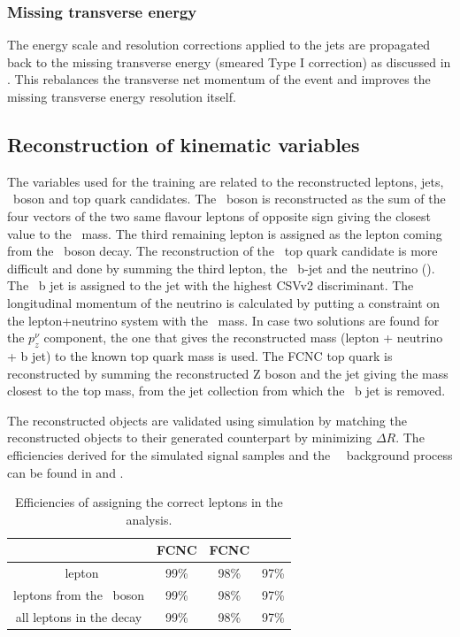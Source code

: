 \subsubsection*{Missing transverse energy}
The energy scale and resolution corrections applied to the jets are propagated back to the  missing transverse energy (smeared Type I correction) as discussed in . This rebalances the transverse net momentum of the event and improves the missing transverse energy resolution itself.

\subsection{Reconstruction of kinematic variables}
The variables used for  the training are related to the reconstructed leptons, jets, \PZ\ boson and top quark candidates. The \PZ\ boson is reconstructed as the sum of the four vectors of the two same flavour leptons of opposite sign giving the closest value to the \PZ\ mass. The third remaining lepton is assigned as the lepton coming from the \PW\ boson decay.
The reconstruction of the \SM\ top quark candidate is more difficult and done by summing the third lepton, the \SM\ b-jet and the neutrino (\Etmis). The \SM\ b jet is assigned to the jet with the highest CSVv2 discriminant. The longitudinal momentum of the neutrino is calculated by putting a constraint on the lepton+neutrino system with the \PW\ mass. In case two solutions are found for the $p_z^{\nu}$ component, the one that gives the reconstructed mass (lepton + neutrino + b jet) to  the known top quark mass is used. 
The FCNC top quark is reconstructed by summing the reconstructed Z boson and the jet giving the mass closest to the top mass, from the jet collection from which the \SM\ b jet is removed. 

The reconstructed objects are validated using simulation by matching the reconstructed objects to their generated counterpart by minimizing $\Delta R$. The efficiencies derived for the simulated signal samples and the \SM\ \tZq\ background process can be found in  and . 

\begin{table}[htbp]
	\centering
	\caption{Efficiencies of assigning the correct leptons in the analysis.}
	\begin{tabular}{cccc}
		\toprule 
		& FCNC \tZq  & FCNC \tZ & \SM\ \tZq \\ 
		\midrule
		\PW\ lepton & 99\% & 98\% & 97\% \\ 
	
		leptons from the \PZ\ boson  & 99\% & 98\% & 97\% \\ 
		 
		all leptons in the decay & 99\% & 98\% & 97\% \\ 
		\bottomrule
	\end{tabular} 
	\label{tab:matching}
\end{table}


